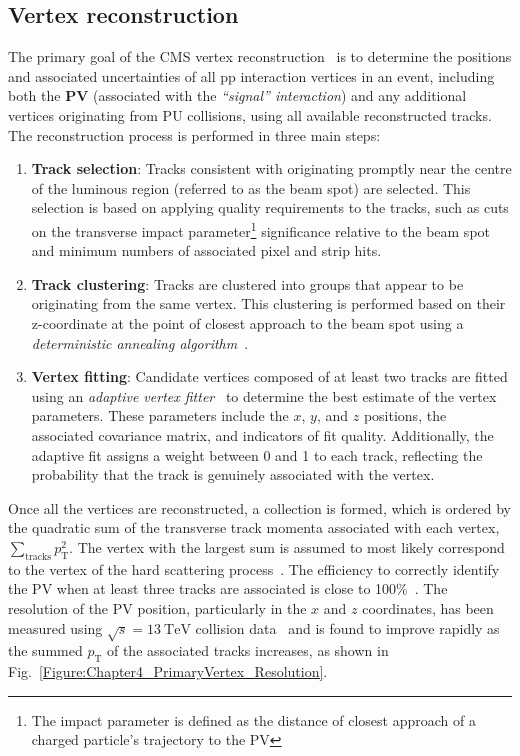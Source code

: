 \subsection{Vertex reconstruction}

The primary goal of the \ac{CMS} vertex reconstruction~\cite{CMS_TrackerPerformance_2014} is to determine the positions and associated uncertainties of all pp interaction vertices in an event, including both the \textbf{\ac{PV}} (associated with the \textit{``signal'' interaction}) and any additional vertices originating from \ac{PU} collisions, using all available reconstructed tracks. The reconstruction process is performed in three main steps: 

\begin{enumerate}
    \item \textbf{Track selection}: Tracks consistent with originating promptly near the centre of the luminous region (referred to as the beam spot) are selected. This selection is based on applying quality requirements to the tracks, such as cuts on the transverse impact parameter\footnote{The impact parameter is defined as the distance of closest approach of a charged particle’s trajectory to the \ac{PV}} significance relative to the beam spot and minimum numbers of associated pixel and strip hits.
    \item \textbf{Track clustering}: Tracks are clustered into groups that appear to be originating from the same vertex. This clustering is performed based on their z-coordinate at the point of closest approach to the beam spot using a \textit{deterministic annealing algorithm}~\cite{DeterministicAnnealing}.
    \item \textbf{Vertex fitting}: Candidate vertices composed of at least two tracks are fitted using an \textit{adaptive vertex fitter}~\cite{VertexFitting_2006,VertexFitting_2007} to determine the best estimate of the vertex parameters. These parameters include the $x$, $y$, and $z$ positions, the associated covariance matrix, and indicators of fit quality. Additionally, the adaptive fit assigns a weight between 0 and 1 to each track, reflecting the probability that the track is genuinely associated with the vertex.
\end{enumerate}

Once all the vertices are reconstructed, a collection is formed, which is ordered by the quadratic sum of the transverse track momenta associated with each vertex, $\sum_{\text{tracks}} p_{\mathrm{T}}^2$. The vertex with the largest sum is assumed to most likely correspond to the vertex of the hard scattering process~\cite{ParticleFlow}. The efficiency to correctly identify the \ac{PV} when at least three tracks are associated is close to 100\%~\cite{CMS_TrackerPerformance_2014}. The resolution of the \ac{PV} position, particularly in the $x$ and $z$ coordinates, has been measured using $\sqrt{s} = 13\ \mathrm{TeV}$ collision data~\cite{PrimaryVertex_Resolution} and is found to improve rapidly as the summed $p_{\mathrm{T}}$ of the associated tracks increases, as shown in Fig.~\ref{Figure:Chapter4_PrimaryVertex_Resolution}.

